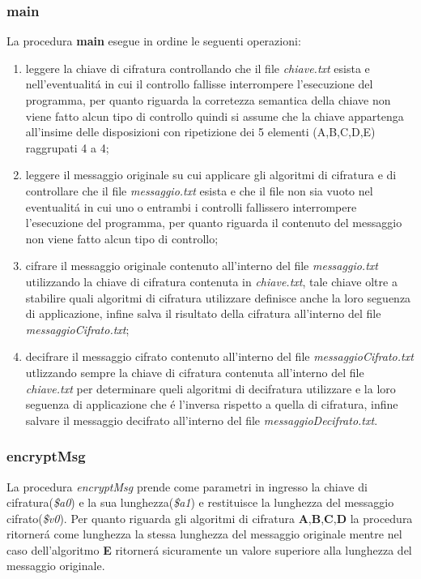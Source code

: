 \documentclass[11pt, oneside]{article}   	%
\begin{document}
\subsubsection{main}
\begin{flushleft}
\setlength{\parindent}{5ex}
La procedura \textbf{main} esegue in ordine le seguenti operazioni:
\begin{enumerate}
	\item leggere la chiave di cifratura controllando che il file \textit{chiave.txt} esista e nell'eventualit\'a in cui il controllo fallisse interrompere l'esecuzione del programma, per quanto riguarda la corretezza semantica della chiave non viene fatto alcun tipo di controllo quindi si assume che la chiave appartenga all'insime delle disposizioni con ripetizione dei 5 elementi (A,B,C,D,E) raggrupati 4 a 4;
	\item leggere il messaggio originale su cui applicare gli algoritmi di cifratura e di controllare che il file \textit{messaggio.txt} esista e che il file non sia vuoto nel eventualit\'a in cui uno o entrambi i controlli fallissero interrompere l'esecuzione del programma, per quanto riguarda il contenuto del messaggio non viene fatto alcun tipo di controllo;
	\item cifrare il messaggio originale contenuto all'interno del file \textit{messaggio.txt} utilizzando la chiave di cifratura contenuta in \textit{chiave.txt}, tale chiave oltre a stabilire quali algoritmi di cifratura utilizzare definisce anche la loro seguenza di applicazione, infine salva il risultato della cifratura all'interno del file \textit{messaggioCifrato.txt};
	\item decifrare il messaggio cifrato contenuto all'interno del file \textit{messaggioCifrato.txt} utlizzando sempre la chiave di cifratura contenuta all'interno del file \textit{chiave.txt} per determinare queli algoritmi di decifratura utilizzare e la loro seguenza di applicazione che \'e l'inversa rispetto a quella di cifratura, infine salvare il messaggio decifrato all'interno del file \textit{messaggioDecifrato.txt}.     
 \end{enumerate}
 \end{flushleft} 

\subsubsection{encryptMsg}
La procedura \textit{encryptMsg} prende come parametri in ingresso la chiave di cifratura(\textit{\$a0}) e la sua lunghezza(\textit{\$a1}) e restituisce la lunghezza del messaggio cifrato(\textit{\$v0}). Per quanto riguarda gli algoritmi di cifratura \textbf{A},\textbf{B},\textbf{C},\textbf{D} la procedura ritorner\'a come lunghezza la stessa lunghezza del messaggio originale mentre nel caso dell'algoritmo \textbf{E} ritorner\'a sicuramente un valore superiore alla lunghezza del messaggio originale. \par
\end{document}
